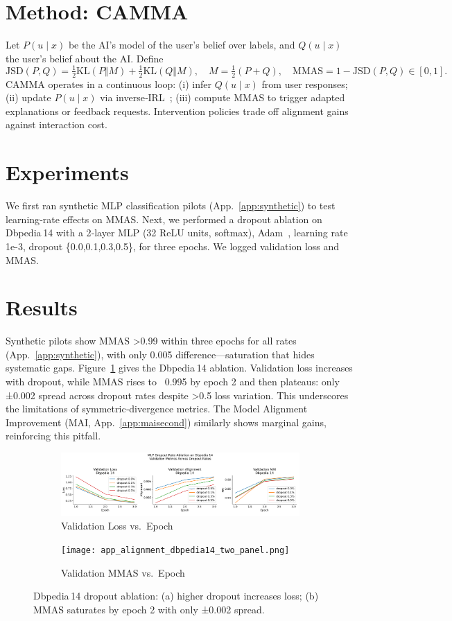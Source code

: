 \documentclass{article}
\begin{document}
\section{Method: CAMMA}
Let $P(u\!\mid x)$ be the AI's model of the user's belief over labels, and $Q(u\!\mid x)$ the user's belief about the AI. Define
\[
\mathrm{JSD}(P,Q)=\tfrac12\mathrm{KL}(P\Vert M)+\tfrac12\mathrm{KL}(Q\Vert M),
\quad M=\tfrac12(P+Q),
\quad
\mathrm{MMAS}=1-\mathrm{JSD}(P,Q)\in[0,1].
\]
CAMMA operates in a continuous loop: 
(i) infer $Q(u\!\mid x)$ from user responses; 
(ii) update $P(u\!\mid x)$ via inverse‐IRL~\citep{hadfield-menell2016cooperativeir}; 
(iii) compute MMAS to trigger adapted explanations or feedback requests. Intervention policies trade off alignment gains against interaction cost.

\section{Experiments}
We first ran synthetic MLP classification pilots (App.~\ref{app:synthetic}) to test learning‐rate effects on MMAS. Next, we performed a dropout ablation on Dbpedia 14 with a 2‐layer MLP (32 ReLU units, softmax), Adam~\citep{kingma2014adamam}, learning rate 1e-3, dropout \{0.0,0.1,0.3,0.5\}, for three epochs. We logged validation loss and MMAS.

\section{Results}
Synthetic pilots show MMAS >0.99 within three epochs for all rates (App.~\ref{app:synthetic}), with only 0.005 difference—saturation that hides systematic gaps. Figure~\ref{fig:dropout_main} gives the Dbpedia 14 ablation. Validation loss increases with dropout, while MMAS rises to ~0.995 by epoch 2 and then plateaus: only ±0.002 spread across dropout rates despite >0.5 loss variation. This underscores the limitations of symmetric‐divergence metrics. The Model Alignment Improvement (MAI, App.~\ref{app:maisecond}) similarly shows marginal gains, reinforcing this pitfall.

\begin{figure}[t]
  \centering
  \begin{subfigure}[b]{0.48\linewidth}
    \includegraphics[width=\linewidth]{fig2_mlp_dropout_dbpedia14.png}
    \caption{Validation Loss vs.\ Epoch}
  \end{subfigure}
  \hfill
  \begin{subfigure}[b]{0.48\linewidth}
    \texttt{[image: app\_alignment\_dbpedia14\_two\_panel.png]}
    \caption{Validation MMAS vs.\ Epoch}
  \end{subfigure}
  \caption{Dbpedia 14 dropout ablation: (a) higher dropout increases loss; (b) MMAS saturates by epoch 2 with only ±0.002 spread.}
  \label{fig:dropout_main}
\end{figure}
\end{document}
